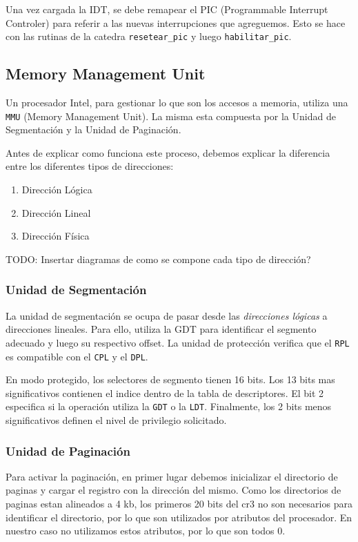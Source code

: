 Una vez cargada la IDT, se debe remapear el PIC (Programmable Interrupt Controler) para referir a las nuevas interrupciones que agreguemos. Esto se hace con las rutinas de la catedra \texttt{resetear\_pic} y luego \texttt{habilitar\_pic}.

\subsection{Memory Management Unit}
Un procesador Intel, para gestionar lo que son los accesos a memoria, utiliza una \texttt{MMU} (Memory Management Unit). La misma esta compuesta por la Unidad de Segmentación y la Unidad de Paginación.

Antes de explicar como funciona este proceso, debemos explicar la diferencia entre los diferentes tipos de direcciones:

\begin{enumerate}
\item Dirección Lógica
\item Dirección Lineal
\item Dirección Física
\end{enumerate}

TODO: Insertar diagramas de como se compone cada tipo de dirección?

\subsubsection{Unidad de Segmentación}

La unidad de segmentación se ocupa de pasar desde las \textit{direcciones lógicas} a direcciones lineales. Para ello, utiliza la GDT para identificar el segmento adecuado y luego su respectivo offset. La unidad de protección verifica que el \texttt{RPL} es compatible con el \texttt{CPL} y el \texttt{DPL}.

En modo protegido, los selectores de segmento tienen 16 bits. Los 13 bits mas significativos contienen el indice dentro de la tabla de descriptores. El bit 2 especifica si la operación utiliza la \texttt{GDT} o la \texttt{LDT}. Finalmente, los 2 bits menos significativos definen el nivel de privilegio solicitado.

\subsubsection{Unidad de Paginación}

Para activar la paginación, en primer lugar debemos inicializar el directorio de paginas y cargar el registro  con la dirección del mismo. Como los directorios de paginas estan alineados a 4 kb, los primeros 20 bits del cr3 no son necesarios para identificar el directorio, por lo que son utilizados por atributos del procesador. En nuestro caso no utilizamos estos atributos, por lo que son todos 0.

